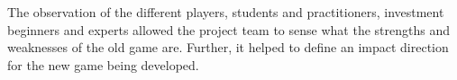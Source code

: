 The observation of the different players, students and practitioners, investment beginners and experts allowed the project team to sense what the strengths and weaknesses of the old game are. Further, it helped to define an impact direction for the new game being developed.



